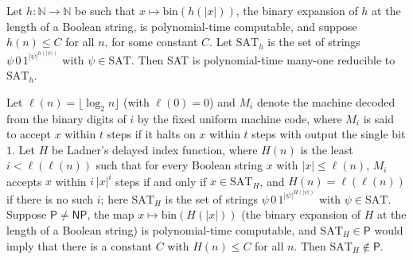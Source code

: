 \begin{theorem}
\label{Complexity.ladner_bounded_pad_reduction}
\leanok
{}
Let $h:\mathbb N\to\mathbb N$ be such that $x\mapsto\mathrm{bin}(h(|x|))$, the binary expansion of
$h$ at the length of a Boolean string, is polynomial-time computable, and suppose $h(n)\le C$ for
all $n$, for some constant $C$. Let $\mathrm{SAT}_h$ is the set of strings $\psi\,0\,1^{|\psi|^{h(|\psi|)}}$ with $\psi\in\mathrm{SAT}$. Then SAT is polynomial-time many-one reducible to
$\mathrm{SAT}_h$.
\end{theorem}

\begin{theorem}
\label{Complexity.ladner_outside_P}
\leanok
{}
Let $\ell(n)=\lfloor\log_2 n\rfloor$ (with $\ell(0)=0$) and $M_i$ denote the machine decoded from the binary digits of $i$ by the fixed uniform machine code, where $M_i$ is said to accept $x$ within $t$ steps if it halts on $x$ within $t$ steps with output the single bit $1$. Let $H$ be Ladner's delayed index function, where $H(n)$ is the least $i<\ell(\ell(n))$ such that for every Boolean string $x$ with $|x|\le\ell(n)$, $M_i$ accepts $x$ within $i\,|x|^i$ steps if and only if $x\in\mathrm{SAT}_H$, and $H(n)=\ell(\ell(n))$ if there is no such $i$; here $\mathrm{SAT}_H$ is the set of strings $\psi\,0\,1^{|\psi|^{H(|\psi|)}}$ with $\psi\in\mathrm{SAT}$. Suppose $\mathsf P\ne\mathsf{NP}$, the map
$x\mapsto\mathrm{bin}(H(|x|))$ (the binary expansion of $H$ at the length of a Boolean string) is
polynomial-time computable, and $\mathrm{SAT}_H\in\mathsf P$ would imply that there is a constant
$C$ with $H(n)\le C$ for all $n$. Then $\mathrm{SAT}_H\notin\mathsf P$.
\end{theorem}

